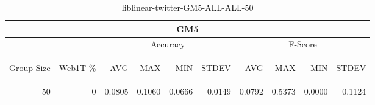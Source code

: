 \begin{center}
\begin{table}[htbp]
\begin{tabular}{ | r | r | r | r | r | r | r | r | r | r |}
\hline
\multicolumn{10}{|c|}{GM5}\\
\hline
 & & \multicolumn{4}{|c|}{Accuracy} & \multicolumn{4}{|c|}{F-Score}\\ \cline{3-10}
\begin{sideways}Group Size\end{sideways} & \begin{sideways}Web1T \%\end{sideways} & \begin{sideways}AVG\end{sideways} & \begin{sideways}MAX\end{sideways} & \begin{sideways}MIN\end{sideways} & \begin{sideways}STDEV\end{sideways} & \begin{sideways}AVG\end{sideways} & \begin{sideways}MAX\end{sideways} & \begin{sideways}MIN\end{sideways} & \begin{sideways}STDEV\end{sideways}\\
\hline
\multirow{0}{*}{50}
 & 0 & 0.0805 & 0.1060 & 0.0666 & 0.0149 & 0.0792 & 0.5373 & 0.0000 & 0.1124\\ \cline{2-10}
\hline
\end{tabular}
\caption{liblinear-twitter-GM5-ALL-ALL-50}
\label{table:liblinear-twitter-GM5-ALL-ALL-50}
\end{table}
\end{center}

